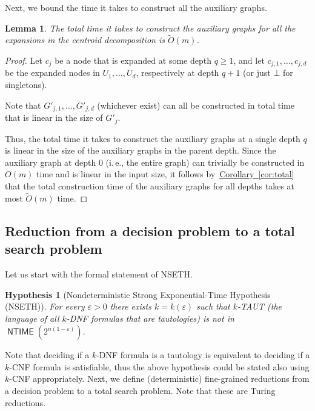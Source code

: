 \documentclass[11pt]{article}
\numberwithin{equation}{section}
\newtheorem{lemma}[theorem]{Lemma}
\theoremstyle{definition}
\theoremstyle{plain}
\newcommand{\ie}{i.\,e.}
\newcommand{\expref}[2]{\hyperref[#2]{#1~\ref{#2}}}
\newtheorem{hypothesis}[theorem]{Hypothesis}
\theoremstyle{plain}
\newcommand{\NSETH}{NSETH\xspace}
\DeclareMathOperator{\NTIME}{\mathsf{NTIME}}
\newcommand\tO{\ensuremath{\widetilde O}}  %
\begin{document}
Next, we bound the time it takes to construct all the auxiliary graphs.
\begin{lemma}\label{lemma:construction_time}
The total time it takes to construct the auxiliary graphs for all the expansions in the centroid decomposition is $\tO(m)$.
\end{lemma}

\begin{proof}
Let $c_j$ be a node that is expanded at some depth $q\geq 1$, and let $c_{j,1},\dots,c_{j,d}$ be the expanded nodes in $U_{1},\dots,U_{d}$, respectively at depth $q+1$ (or just $\bot$ for singletons).

Note that $G'_{j,1},\dots,G'_{j,d}$ (whichever exist) can all be constructed in total time that is linear in the size of $G'_j$.

Thus, the total time it takes to construct the auxiliary graphs at a single depth $q$ is linear in the size of the auxiliary graphs in the parent depth. Since the auxiliary graph at depth $0$ (\ie, the entire graph) can trivially be constructed in $O(m)$ time and is linear in the input size, it follows by~\expref{Corollary}{cor:total} that the total construction time of the auxiliary graphs for all depths takes at most $\tO(m)$ time.
\end{proof}

\subsection{Reduction from a decision problem to a total search problem}\label{subsec:reduction}

Let us start with the formal statement of \NSETH.
\begin{hypothesis}[Nondeterministic Strong Exponential-Time Hypothesis (\NSETH)]
For every $\varepsilon>0$ there exists $k=k(\varepsilon)$ such that $k$-TAUT (the language of all $k$-DNF formulas that are tautologies) is not in $\NTIME(2^{n(1-\varepsilon)})$.
\end{hypothesis}
Note that deciding if a $k$-DNF formula is a tautology is equivalent to deciding if a $k$-CNF formula is satisfiable, thus the above hypothesis could be stated also using $k$-CNF appropriately.
Next, we define (deterministic) fine-grained reductions from a decision problem to a total search problem. Note that these are Turing reductions.
\end{document}
